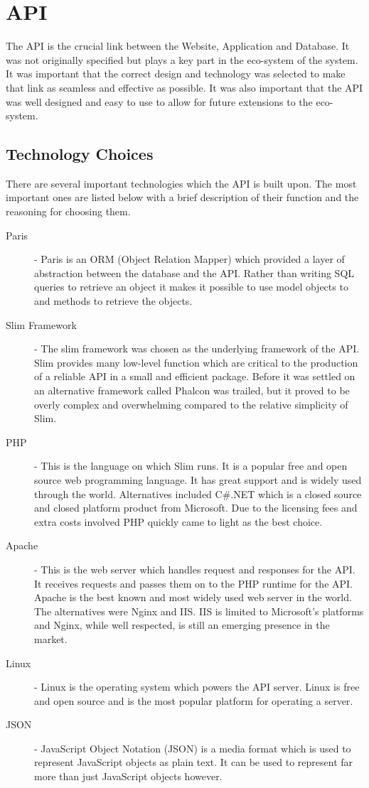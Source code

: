 \documentclass[11pt,a4paper]{report}
\begin{document}
\section{API} 
\label{sec:api-design}

The API is the crucial link between the Website, Application and Database. It was not originally specified but plays a key part in the eco-system of the system. It was important that the correct design and technology was selected to make that link as seamless and effective as possible. It was also important that the API was well designed and easy to use to allow for future extensions to the eco-system. 

\subsection{Technology Choices}
\label{sec:api:techChoices}

There are several important technologies which the API is built upon. The most important ones are listed below with a brief description of their function and the reasoning for choosing them. 

\begin{description}
\item[Paris] - Paris is an ORM (Object Relation Mapper) which provided a layer of abstraction between the database and the API. Rather than writing SQL queries to retrieve an object it makes it possible to use model objects to and methods to retrieve the objects.  
\item[Slim Framework] - The slim framework was chosen as the underlying framework of the API. Slim provides many low-level function which are critical to the production of a reliable API in a small and efficient package. Before it was settled on an alternative framework called Phalcon was trailed, but it proved to be overly complex and overwhelming compared to the relative simplicity of Slim. 
\item[PHP] - This is the language on which Slim runs. It is a popular free and open source web programming language. It has great support and is widely used through the world. Alternatives included C\#.NET which is a closed source and closed platform product from Microsoft. Due to the licensing fees and extra costs involved PHP quickly came to light as the best choice. 
\item[Apache] - This is the web server which handles request and responses for the API. It receives requests and passes them on to the PHP runtime for the API. Apache is the best known and most widely used web server in the world. The alternatives were Nginx and IIS. IIS is limited to Microsoft's platforms and Nginx, while well respected, is still an emerging presence in the market. 
\item[Linux] - Linux is the operating system which powers the API server. Linux is free and open source and is the most popular platform for operating a server.
\item[JSON] - JavaScript Object Notation (JSON) is a media format which is used to represent JavaScript objects as plain text. It can be used to represent far more than just JavaScript objects however. 
\end{description}
\end{document}
